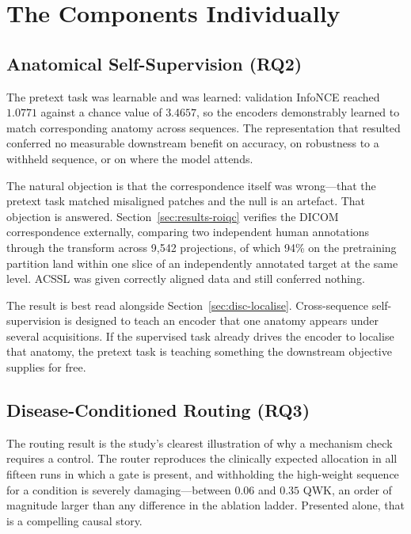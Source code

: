 \documentclass[12pt,a4paper]{report}
\begin{document}
\section{The Components Individually}
\label{sec:disc-components}

\subsection{Anatomical Self-Supervision (RQ2)}

The pretext task was learnable and was learned: validation InfoNCE reached
$1.0771$ against a chance value of $3.4657$, so the encoders demonstrably
learned to match corresponding anatomy across sequences. The representation
that resulted conferred no measurable downstream benefit on accuracy, on
robustness to a withheld sequence, or on where the model attends.

The natural objection is that the correspondence itself was wrong---that the
pretext task matched misaligned patches and the null is an artefact. That
objection is answered. Section~\ref{sec:results-roiqc} verifies the DICOM
correspondence externally, comparing two independent human annotations through
the transform across 9{,}542 projections, of which 94\% on the pretraining
partition land within one slice of an independently annotated target at the same
level. ACSSL was given correctly aligned data and still conferred nothing.

The result is best read alongside Section~\ref{sec:disc-localise}. Cross-sequence
self-supervision is designed to teach an encoder that one anatomy appears under
several acquisitions. If the supervised task already drives the encoder to
localise that anatomy, the pretext task is teaching something the downstream
objective supplies for free.

\subsection{Disease-Conditioned Routing (RQ3)}

The routing result is the study's clearest illustration of why a mechanism check
requires a control. The router reproduces the clinically expected allocation in
all fifteen runs in which a gate is present, and withholding the
high-weight sequence for a condition is severely damaging---between $0.06$ and
$0.35$ QWK, an order of magnitude larger than any difference in the ablation
ladder. Presented alone, that is a compelling causal story.
\end{document}
